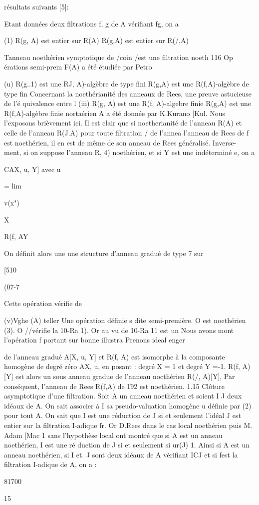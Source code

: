 \documentclass[11pt, twoside]{article}
\begin{document}
r\'{e}sultats suivants [5]:

Etant donn\'{e}es deux filtrations f, g de A v\'{e}rifiant fg, on a

(1) R(g, A) est entier sur R(A) R(g,A) est entier sur R(/,A)

Tanneau noeth\'{e}rien symptotique de /coin /est une filtration noeth 116 Op%
\'{e}rations semi-prem F(A) a \'{e}t\'{e} \'{e}tudi\'{e}e par Petro

(u) R(g..1) est une RJ, A)-alg\`{e}bre de type fini \TEXTsymbol{<}%
\TEXTsymbol{>} R(g,A) est une R(f,A)-alg\`{e}bre de type fin Concernant la
noeth\'{e}rianit\'{e} des anneaux de Rees, une preuve astucieuse de l'\'{e}%
quivalence entre l (iii) R(g, A) est une R(f, A)-algebre finie R(g,A) est
une R(f,A)-alg\`{e}bre finie norta\'{e}rien A a \'{e}t\'{e} donn\'{e}e par
K.Kurano [Kul. Nous l'exposons bri\`{e}vement ici. Il est clair que si
noetherianit\'{e} de l'anneau R(A) et celle de l'anneau R(J.A) pour toute
filtration / de l'annea l'anneau de Rees de f est noeth\'{e}rien, il en est
de m\^{e}me de son anneau de Rees g\'{e}n\'{e}ralis\'{e}. Inverse- ment, si
on suppose l'anneau R, 4) noeth\'{e}rien, et si Y est une ind\'{e}termin\'{e}%
e, on a

CAX, u, Y] avec u

= lim

v(x")

X

R(f, AY

On d\'{e}finit alors une une structure d'anneau gradu\'{e} de type 7 sur

[510

(07-7

Cette op\'{e}ration v\'{e}rifie de

(v)Vghe (A) teller Une op\'{e}ration d\'{e}finie s dite semi-premi\`{e}re. O
est noeth\'{e}rien (3). O //v\'{e}rifie la 10-Ra 1). Or au vu de 10-Ra 11
est un Nous avons mont l'op\'{e}ration f portant sur bonne illustra Prenons
ideal enger

de l'anneau gradu\'{e} A[X, u, Y] et R(f, A) est isomorphe \`{a} la
composante homog\`{e}ne de degr\'{e} z\'{e}ro AX, u, en posant : degr\'{e} X
= 1 et degr\'{e} Y =-1. R(f, A)[Y] est alors un sous anneau gradue de
l'anneau nocth\'{e}rien R(/, A)[Y], Par cons\'{e}quent, l'anneau de Rees
R(f,A) de \U{192} est noeth\'{e}rien. 1.15 Cl\^{o}ture asymptotique d'une
filtration. Soit A un anneau noeth\'{e}rien et soient I J deux id\'{e}aux de
A. On sait associer \`{a} I sa pseudo-valuation homog\`{e}ne u d\'{e}finie
par (2) pour tout A. On sait que I est une r\'{e}duction de J si et
seulement l'id\'{e}al J est entier sur la filtration I-adique fr. Or D.Rees
dans le cas local noeth\'{e}rien puis M. Adam [Mac 1 sans l'hypoth\`{e}se
local ont montr\'{e} que si A est un anneau noeth\'{e}rien, I est une r\'{e}%
duction de J si et seulement si ur(J) \TEXTsymbol{>} 1. Ainsi si A est un
anneau noeth\'{e}rien, si I et. J sont deux id\'{e}aux de A v\'{e}rifiant
ICJ et si fest la filtration I-adique de A, on a :

81700

15
\end{document}
